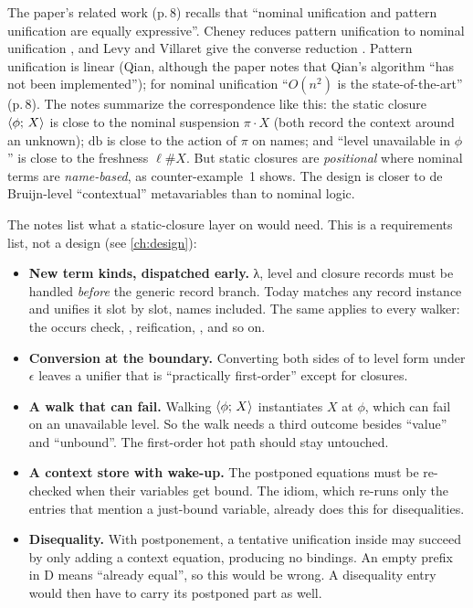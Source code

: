The paper's related work (p.\,8) recalls that \enquote{nominal unification and pattern unification are
equally expressive}. Cheney reduces pattern unification to nominal unification \cite{Cheney2005}, and
Levy and Villaret give the converse reduction \cite{LevyVillaret2008}. Pattern unification is linear
(Qian, although the paper notes that Qian's algorithm \enquote{has not been implemented}); for nominal
unification \enquote{$O(n^2)$ is the state-of-the-art} (p.\,8). The notes summarize the correspondence like this:
the static closure $\langle \phi;\,X\rangle$ is close to the nominal suspension $\pi\cdot X$ (both record the
context around an unknown); $\mathrm{db}$ is close to the action of $\pi$ on names; and \enquote{level
unavailable in $\phi$} is close to the freshness $\ell\#X$. But static closures are
\emph{positional} where nominal terms are \emph{name-based}, as counter-example~1 shows. The design is
closer to de Bruijn-level \enquote{contextual} metavariables than to nominal logic.

\begin{kanren}
The notes list what a static-closure layer on \micro{} would need. This is a requirements list, not a
design (see \cref{ch:design}):
\begin{itemize}
  \item \textbf{New term kinds, dispatched early.} λ, level and closure records must be handled
    \emph{before} the generic record branch. Today  matches any record
    instance and unifies it slot by slot, names included. The same applies to every walker: the occurs
    check, , reification, , and so on.
  \item \textbf{Conversion at the boundary.} Converting both sides of  to level form under
    $\epsilon$ leaves a unifier that is \enquote{practically first-order} except for closures.
  \item \textbf{A walk that can fail.} Walking $\langle \phi;\,X\rangle$ instantiates $X$ at $\phi$, which can
    fail on an unavailable level. So the walk needs a third outcome besides \enquote{value} and
    \enquote{unbound}. The first-order hot path should stay untouched.
  \item \textbf{A context store with wake-up.} The postponed equations must be re-checked when their
    variables get bound. The  idiom, which re-runs only the entries that
    mention a just-bound variable, already does this for disequalities.
  \item \textbf{Disequality.} With postponement, a tentative unification inside  may succeed
    by only adding a context equation, producing no bindings. An empty prefix in D means
    \enquote{already equal}, so this would be wrong. A disequality entry would then have to carry
    its postponed part as well.
\end{itemize}
\end{kanren}

